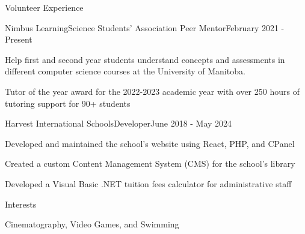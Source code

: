 \documentclass{article}
\newlength{\tabin}
\newlength{\secsep}
\newcommand{\lineunder}{\vspace*{-8pt} \\ \hspace*{-6pt} \hrulefill \\ \vspace*{-15pt}}
\newenvironment{tabbedsection}[1]{
    \begin{list}{}{
        \setlength{\itemsep}{0pt}
        \setlength{\labelsep}{0pt}
        \setlength{\labelwidth}{0pt}
        \setlength{\leftmargin}{\tabin}
        \setlength{\rightmargin}{\tabin}
        \setlength{\listparindent}{0pt}
        \setlength{\parsep}{0pt}
        \setlength{\parskip}{0pt}
        \setlength{\partopsep}{0pt}
        \setlength{\topsep}{#1}
    }
        \item[]
        }{
    \end{list}}
\newenvironment{nospacetabbing}{
    \begin{tabbing}
    }{\end{tabbing}\vspace{-1.2em}}
\newenvironment{resume_section}[1]{
    \vspace{2\secsep}
    \textsc{\large#1}
    \lineunder
    \begin{tabbedsection}{\secsep}
    }{\end{tabbedsection}}
\newenvironment{subitems}{
    \renewcommand{\labelitemi}{-}
    \begin{itemize}
        \setlength{\labelsep}{1em}
        }{
    \end{itemize}}
\newenvironment{resume_employer}[4]{
    \vspace{\secsep}
    \begin{minipage}[t]{0.75\linewidth}
        \textbf{#1}\\
        \small #2
    \end{minipage}%
    \begin{minipage}[t]{0.25\linewidth}
        \hfill \footnotesize #4
    \end{minipage}
    \vspace{0.1em}\\
    \begin{tabbedsection}{0pt}
        \begin{subitems}
        }{\end{subitems}
    \end{tabbedsection}}
\begin{document}
    \begin{resume_section}{Volunteer Experience}
        \begin{resume_employer}{Nimbus Learning}{Science Students' Association Peer Mentor}{}{February 2021 - Present}
            \item Help first and second year students understand concepts and assessments in different computer
            science courses at the University of Manitoba.
            \item Tutor of the year award for the 2022-2023 academic year with over 250 hours of tutoring support for 90+ students
        \end{resume_employer}

        \begin{resume_employer}{Harvest International Schools}{Developer}{}{June 2018 - May 2024}
            \item Developed and maintained the school's website using React, PHP, and CPanel
            \item Created a custom Content Management System (CMS) for the school's library
            \item Developed a Visual Basic .NET tuition fees calculator for administrative staff
        \end{resume_employer}
    \end{resume_section}

    \begin{resume_section}{Interests}
        \begin{nospacetabbing}
            Cinematography, Video Games, and Swimming
        \end{nospacetabbing}
    \end{resume_section}
\end{document}
